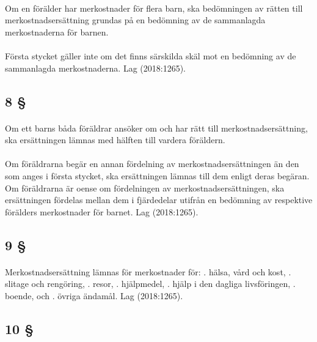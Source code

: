 \documentclass[a4paper,notitlepage,openany,10pt]{book}
\begin{document}
\paragraph*{}
Om en förälder har merkostnader för flera barn, ska bedömningen av rätten till merkostnadsersättning grundas på en bedömning av de sammanlagda merkostnaderna för barnen.
\paragraph*{}
Första stycket gäller inte om det finns särskilda skäl mot en bedömning av de sammanlagda merkostnaderna.
Lag (2018:1265).
\subsection*{8 §}
\paragraph*{}
Om ett barns båda föräldrar ansöker om och har rätt till merkostnadsersättning, ska ersättningen lämnas med hälften till vardera föräldern.
\paragraph*{}
Om föräldrarna begär en annan fördelning av merkostnadsersättningen än den som anges i första stycket, ska ersättningen lämnas till dem enligt deras begäran. Om föräldrarna är oense om fördelningen av merkostnadsersättningen, ska ersättningen fördelas mellan dem i fjärdedelar utifrån en bedömning av respektive förälders merkostnader för barnet.
Lag (2018:1265).
\subsection*{9 §}
\paragraph*{}
Merkostnadsersättning lämnas för merkostnader för:
. hälsa, vård och kost,
. slitage och rengöring,
. resor,
. hjälpmedel,
. hjälp i den dagliga livsföringen,
. boende, och
. övriga ändamål.
Lag (2018:1265).
\subsection*{10 §}
\end{document}
